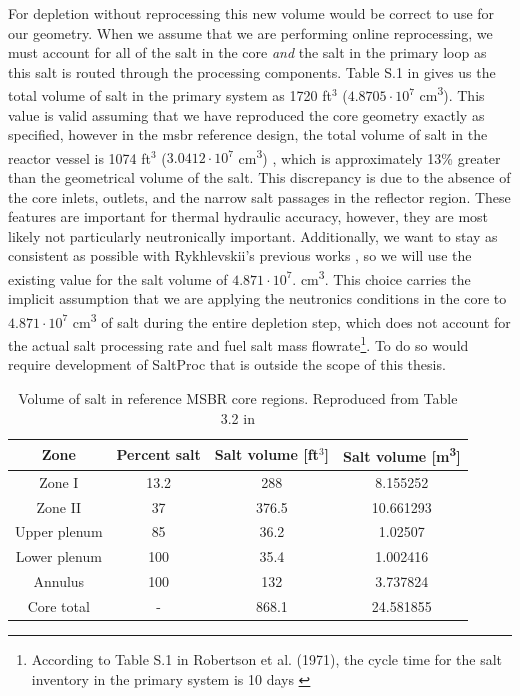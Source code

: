 For depletion without reprocessing this new volume would be correct to
use for our geometry. When we assume that we are performing online reprocessing,
we must account for all of the salt in the core {\it and} the salt in the
primary loop as this salt is routed through the processing components. Table S.1
in \cite{robertson_conceptual_1971} gives us the total volume of salt in the
primary system as  1720 ft$^{3}$ ($4.8705\cdot 10^7$ \unit{\centi\metre\cubed}).
This value is valid assuming that we have reproduced the core geometry exactly
as specified, however in the \Gls{msbr} reference design, the total volume of
salt in the reactor vessel is 1074 ft$^{3}$ ($3.0412 \cdot 10^{7}$
\unit{\centi\metre\cubed}) \cite{robertson_conceptual_1971}, which is 
approximately 13\% greater than the geometrical volume of the salt. This
discrepancy is due to the absence of the core inlets, outlets, and the narrow
salt passages in the reflector region. These features are important for thermal
hydraulic accuracy, however, they are most likely not particularly neutronically
important. Additionally, we want to stay as consistent as possible with
Rykhlevskii's previous works \cite{rykhlevskii_fuel_2020}
\cite{rykhlevskii_modeling_2019}, so we will use the existing value for the salt
volume of $4.871\cdot 10^7$. \unit{\centi\metre\cubed}. This choice carries the
implicit assumption that we are applying the neutronics conditions in the core to
$4.871\cdot 10^{7}$ \unit{\centi\metre\cubed} of salt during the entire
depletion step, which does not account for the actual salt processing rate and
fuel salt mass flowrate\footnote{According to Table S.1 in Robertson et al.
(1971), the cycle time for the salt inventory in the primary system is 10 days
\cite{robertson_conceptual_1971}}. To do so would require development of
SaltProc that is outside the scope of this thesis.

\begin{table}[htpb]
    \centering
    \caption[Volume of salt in reference MSBR core regions]{Volume of salt in
reference MSBR core regions. Reproduced from Table 3.2 in
\cite{robertson_conceptual_1971}}
    \label{tab:salt-volumes}
    \begin{tabular}{|c|c|cc|}
        \hline
        Zone & Percent salt & Salt volume [ft$^3$] & Salt volume [\unit{\metre\cubed}] \\
        \hline
        Zone I & 13.2 & 288 & 8.155252 \\
        \hline
        Zone II & 37 & 376.5 & 10.661293 \\
        \hline
        Upper plenum & 85 & 36.2 & 1.02507 \\ 
        \hline
        Lower plenum & 100 & 35.4 & 1.002416 \\ 
        \hline
        Annulus & 100 &  132 & 3.737824\\
        \hline
        Core total & - & 868.1 & 24.581855 \\ 
        \hline
    \end{tabular}
\end{table}

